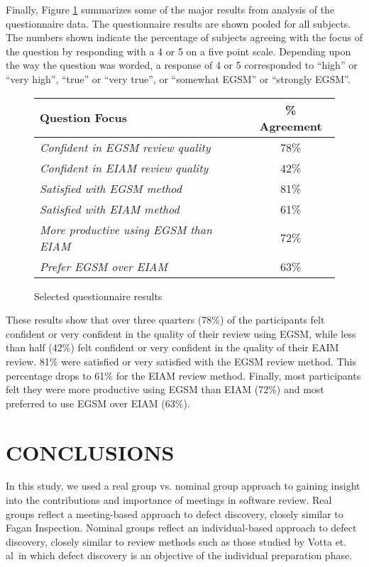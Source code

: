 Finally, Figure \ref{fig:quest-results} summarizes some of the major
results from analysis of the questionnaire data.  The questionnaire results
are shown pooled for all subjects.  The numbers shown indicate the
percentage of subjects agreeing with the focus of the question by
responding with a 4 or 5 on a five point scale.  Depending upon the way the
question was worded, a response of 4 or 5 corresponded to ``high'' or
``very high'', ``true'' or ``very true'', or ``somewhat EGSM'' or
``strongly EGSM''.

\begin{figure}[ht]
\small
  \begin{center}
  \begin{tabular}{|l|c|}
   \hline
Question Focus                   & \% Agreement \\
   \hline
{\em Confident in EGSM review quality} & 78\% \\
{\em Confident in EIAM review quality} & 42\% \\
{\em Satisfied with EGSM method} & 81\% \\
{\em Satisfied with EIAM method} & 61\% \\
{\em More productive using EGSM than EIAM} & 72\% \\
{\em Prefer EGSM over EIAM} & 63\% \\
  \hline
   \end{tabular}
  \end{center}
 \caption{Selected questionnaire results}
 \label{fig:quest-results}
\normalsize
\end{figure}

These results show that over three quarters (78\%) of the participants felt
confident or very confident in the quality of their review using EGSM,
while less than half (42\%) felt confident or very confident in the quality
of their EAIM review. 81\% were satisfied or very satisfied with the EGSM
review method. This percentage drops to 61\% for the EIAM review method.
Finally, most participants felt they were more productive using EGSM than
EIAM (72\%) and most preferred to use EGSM over EIAM (63\%).

\section{CONCLUSIONS}

In this study, we used a real group vs. nominal group approach to gaining
insight into the contributions and importance of meetings in software
review. Real groups reflect a meeting-based approach to defect discovery,
closely similar to Fagan Inspection. Nominal groups reflect an
individual-based approach to defect discovery, closely similar to review
methods such as those studied by Votta et. al~in which defect discovery is
an objective of the individual preparation phase.

